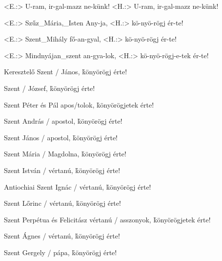 \documentclass[twoside]{article}
\begin{document}
\begin{gregosheet}
            {   <E.:> U-ram, ir-gal-mazz ne-künk! <H.:> U-ram, ir-gal-mazz ne-künk!}
\end{gregosheet}

\begin{gregosheet}
            {   <E.:> Szűz_Mária,_Isten Any-ja, <H.:> kö-nyö-rögj ér-te!}
\end{gregosheet}

\begin{gregosheet}
            {   <E.:> Szent_Mihály fő-an-gyal, <H.:> kö-nyö-rögj ér-te!}
\end{gregosheet}

\begin{gregosheet}
            {   <E.:> Mindnyájan_szent an-gya-lok, <H.:> kö-nyö-rögj-e-tek ér-te!}
\end{gregosheet}

\e Keresztelő Szent / János,                          \hfill\h könyörögj érte!

\e Szent / József,                                    \hfill\h könyörögj érte!

\e Szent Péter és Pál apos/tolok,                     \hfill\h könyörögjetek érte!

\e Szent András / apostol,                            \hfill\h könyörögj érte!

\e Szent János / apostol,                             \hfill\h könyörögj érte!

\e Szent Mária / Magdolna,                            \hfill\h könyörögj érte!

\e Szent István / vértanú,                            \hfill\h könyörögj érte!

\e Antiochiai Szent Ignác / vértanú,                  \hfill\h könyörögj érte!

\e Szent Lőrinc / vértanú,                            \hfill\h könyörögj érte!

\e Szent Perpétua és Felicitász vértanú / asszonyok,  \hfill\h könyörögjetek érte!

\e Szent Ágnes / vértanú,                             \hfill\h könyörögj érte!

\e Szent Gergely / pápa,                              \hfill\h könyörögj érte!
\end{document}

